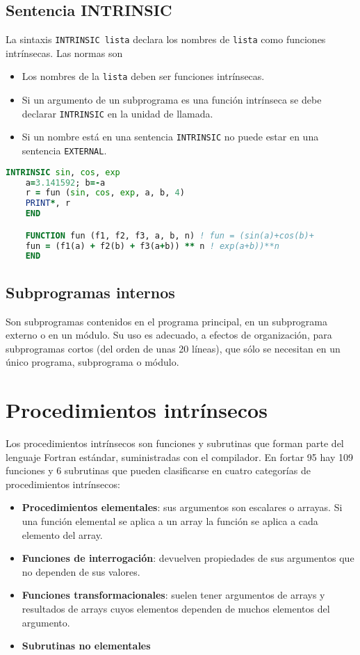 \subsection{Sentencia INTRINSIC}

La sintaxis {\tt INTRINSIC lista} declara los nombres de {\tt lista} como funciones intrínsecas. Las normas son
\begin{itemize}
	\item Los nombres de la {\tt lista} deben ser funciones intrínsecas.
	\item Si un argumento de un subprograma es una función intrínseca se debe declarar {\tt INTRINSIC} en la unidad de llamada. 
	\item Si un nombre está en una sentencia {\tt INTRINSIC} no puede estar en una sentencia {\tt EXTERNAL}.
\end{itemize}

\begin{lstlisting}[language=Fortran]
	INTRINSIC sin, cos, exp
	a=3.141592; b=-a
	r = fun (sin, cos, exp, a, b, 4)
	PRINT*, r
	END

	FUNCTION fun (f1, f2, f3, a, b, n) ! fun = (sin(a)+cos(b)+
	fun = (f1(a) + f2(b) + f3(a+b)) ** n ! exp(a+b))**n	
	END
\end{lstlisting}

\subsection{Subprogramas internos}

Son subprogramas contenidos en el programa principal, en un subprograma externo o en un módulo. Su uso es adecuado, a efectos de organización, para subprogramas cortos (del orden de unas 20 líneas), que sólo se necesitan en un único programa, subprograma o módulo. 



\section{Procedimientos intrínsecos}

Los procedimientos intrínsecos son funciones y subrutinas que forman parte del lenguaje Fortran estándar, suministradas con el compilador. En fortar 95 hay 109 funciones y 6 subrutinas que pueden clasificarse en cuatro categorías de procedimientos intrínsecos:

\begin{itemize}
	\item \textbf{Procedimientos elementales}: sus argumentos son escalares o arrayas. Si una función elemental se aplica a un array la función se aplica a cada elemento del array.
	\item \textbf{Funciones de interrogación}: devuelven propiedades de sus argumentos que no dependen de sus valores.
	\item \textbf{Funciones transformacionales}: suelen tener argumentos de arrays y resultados de arrays cuyos elementos dependen de muchos elementos del argumento.
	\item \textbf{Subrutinas no elementales}
\end{itemize}



